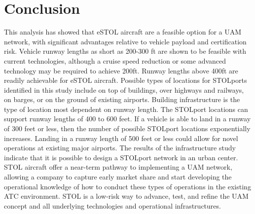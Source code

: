 \documentclass[]{aiaa-tc}%
\begin{document}
\section{Conclusion}
This analysis has showed that eSTOL aircraft are a feasible option for a UAM network, with significant advantages relative to vehicle payload and certification risk.  Vehicle runway lengths as short as 200-300 ft are shown to be feasible with current technologies, although a cruise speed reduction or some advanced technology may be required to achieve 200ft.   Runway lengths above 400ft are readily achievable for eSTOL aircraft. 
Possible types of locations for STOLports identified in this study include on top of buildings, over highways and railways, on barges, or on the ground of existing airports. Building infrastructure is the type of location most dependent on runway length. The STOLport locations can support runway lengths of 400 to 600 feet. If a vehicle is able to land in a runway of 300 feet or less, then the number of possible STOLport locations exponentially increases. Landing in a runway length of 500 feet or less could allow for novel operations at existing major airports. The results of the infrastructure study indicate that it is possible to design a STOLport network in an urban center.
STOL aircraft offer a near-term pathway to implementing a UAM network, allowing a company to capture early market share and start developing the operational knowledge of how to conduct these types of operations in the existing ATC environment.  STOL is a low-risk way to advance, test, and refine the UAM concept and all underlying technologies and operational infrastructures.  


\end{document}
